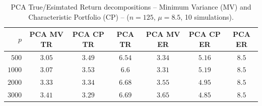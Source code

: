\begin{table}[hpt!] 
\begin{center} 
\begin{tabular}{rcccccc} 
\toprule 
$p$ & PCA MV TR  & PCA CP TR & PCA TR & PCA MV ER & PCA CP ER & PCA ER \\ 
\midrule 
$500$  & $3.05$ & $3.49$ & $6.54$ & $3.34$ & $5.16$ & $8.5$ \\ 
$1000$  & $3.07$ & $3.53$ & $6.6$ & $3.31$ & $5.19$ & $8.5$ \\ 
$2000$  & $3.33$ & $3.34$ & $6.68$ & $3.55$ & $4.95$ & $8.5$ \\ 
$3000$  & $3.41$ & $3.29$ & $6.69$ & $3.65$ & $4.85$ & $8.5$ \\ 
\bottomrule 
\end{tabular} 
\end{center} 
\caption{PCA True/Esimtated Return decompositions -- Minimum Variance (MV) and Characteristic Portfolio (CP) -- ($n = 125$, $\mu = 8.5$,  10 simulations).} 
\label{tab:pcaRD} 
\end{table} 

 
